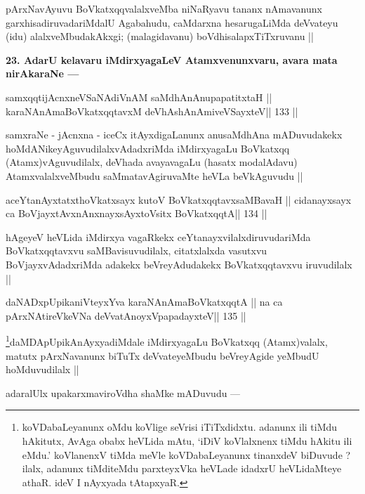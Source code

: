 \begin{artha}
pArxNavAyuvu BoVkatxqqvalalxveMba niNaRyavu tananx nAmavanunx garxhisadiruvadariMdalU Agabahudu, caMdarxna hesarugaLiMda deVvateyu (idu) alalxveMbudakAkxgi; (malagidavanu) boVdhisalapxTiTxruvanu ||
\end{artha}

\begin{artha}
{\bf 23. AdarU kelavaru iMdirxyagaLeV Atamxvenunxvaru, avara mata nirAkaraNe ---}
\end{artha}

\begin{shl}
samxqqtijAcnxneVSaNAdiVnAM saMdhAnAnupapatitxtaH ||
karaNAnAmaBoVkatxqqtavxM deVhAshAnAmiveVSayxteV\hfill || 133 ||
\end{shl}

\begin{artha}
samxraNe - jAcnxna - iceCx itAyxdigaLanunx anusaMdhAna mADuvudakekx hoMdANikeyAguvudilalxvAdadxriMda iMdirxyagaLu BoVkatxqq (Atamx)vAguvudilalx, deVhada avayavagaLu (hasatx modalAdavu) AtamxvalalxveMbudu saMmatavAgiruvaMte heVLa beVkAguvudu ||
\end{artha}

\begin{shl}
aceYtanAyxtatxthoVkatxsayx kutoV BoVkatxqqtavxsaMBavaH ||
cidanayxsayx ca BoVjayxtAvxnAnxnayxsAyxtoV\s sitx BoVkatxqqtA\hfill || 134 ||
\end{shl}

\begin{artha}
hAgeyeV heVLida iMdirxya vagaRkekx ceYtanayxvilalxdiruvudariMda BoVkatxqqtavxvu saMBavisuvudilalx, citatxlalxda vasutxvu BoVjayxvAdadxriMda adakekx beVreyAdudakekx BoVkatxqqtavxvu iruvudilalx ||
\end{artha}

\begin{shl}
daNADxpUpikaniVteyxYva karaNAnAmaBoVkatxqqtA ||
na ca pArxNAtireVkeVNa deVvatA\s noyxVpapadayxteV\hfill || 135 ||
\end{shl}

\begin{artha}
\footnote{koVDabaLeyanunx oMdu koVlige seVrisi iTiTxdidxtu. adanunx ili tiMdu hAkitutx, AvAga obabx heVLida mAtu, `iDiV koVlalxnenx tiMdu hAkitu ili eMdu.' koVlanenxV tiMda meVle koVDabaLeyanunx tinanxdeV biDuvude ? ilalx, adanunx tiMditeMdu parxteyxVka heVLade idadxrU heVLidaMteye athaR. ideV I nAyxyada tAtapxyaR.}daMDApUpikAnAyxyadiMdale iMdirxyagaLu BoVkatxqq (Atamx)valalx, matutx pArxNavanunx biTuTx deVvateyeMbudu beVreyAgide yeMbudU hoMduvudilalx ||

adaralUlx upakarxmaviroVdha shaMke mADuvudu ---
\end{artha}

